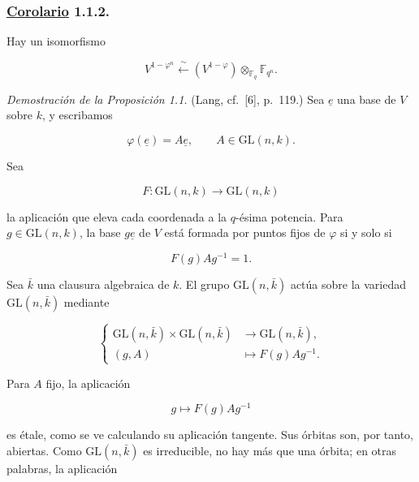 \pageoriginale

\subsubsection*{\underline{Corolario} 1.1.2.}
Hay un isomorfismo

\[
V^{1-\varphi^n}\xleftarrow{\ \sim\ }
(V^{1-\varphi})\otimes_{\mathbb F_q}\mathbb F_{q^n}.
\]

\medskip
\noindent\emph{Demostración de la Proposición 1.1.}
(Lang, cf.~[6], p.~119.) Sea $\underline{e}$ una base de $V$ sobre $k$, y escribamos

\begin{equation}\tag{1.1.3}
\varphi(\underline{e})=A\underline{e},\qquad A\in\mathrm{GL}(n,k).
\end{equation}

Sea

\begin{equation}\tag{1.1.4}
F:\mathrm{GL}(n,k)\longrightarrow\mathrm{GL}(n,k)
\end{equation}

la aplicación que eleva cada coordenada a la $q$-ésima potencia. Para
$g\in\mathrm{GL}(n,k)$, la base $g\underline{e}$ de $V$ está formada por puntos fijos
de $\varphi$ si y solo si

\begin{equation}\tag{1.1.5}
F(g)Ag^{-1}=1.
\end{equation}

Sea $\bar k$ una clausura algebraica de $k$. El grupo
$\mathrm{GL}(n,\bar k)$ actúa sobre la variedad
$\mathrm{GL}(n,\bar k)$ mediante

\begin{equation}\tag{1.1.6}
\left\{
\begin{aligned}
\mathrm{GL}(n,\bar k)\times\mathrm{GL}(n,\bar k)
&\longrightarrow\mathrm{GL}(n,\bar k),\\
(g,A)&\longmapsto F(g)Ag^{-1}.
\end{aligned}
\right.
\end{equation}

Para $A$ fijo, la aplicación

\begin{equation}\tag{1.1.7}
g\longmapsto F(g)Ag^{-1}
\end{equation}

es étale, como se ve calculando su aplicación tangente. Sus órbitas son,
por tanto, abiertas. Como $\mathrm{GL}(n,\bar k)$ es irreducible, no hay
más que una órbita; en otras palabras, la aplicación

